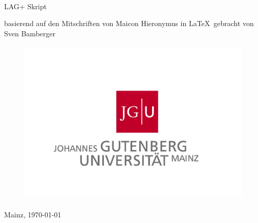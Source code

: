 \begin{titlepage} 
\qquad\\
\vspace{4cm}

 	\begin{center} 
		{\Huge LAG+ Skript 
	\\[2ex] \small{basierend auf den Mitschriften von Maicon Hieronymus in \LaTeX \ gebracht von Sven Bamberger \par } }
		\vspace{2cm}
	 	\begin{figure} [H]
				\centering
				\includegraphics[width=12cm, height=8cm]{front/pics/Logo.jpg}
		\end{figure}

	 	 Mainz,  \today 
	\end{center} 
 \end{titlepage} 